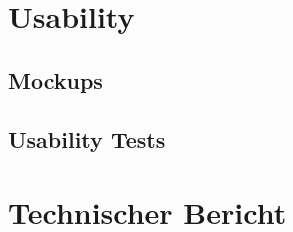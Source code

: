 \chapter{Usability}
\newpage
\section{Mockups}
\section{Usability Tests}


\chapter{Technischer Bericht}
\newpage 







